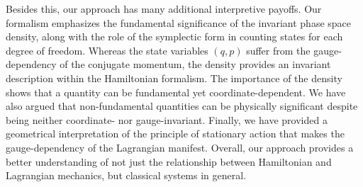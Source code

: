\documentclass[letterpaper]{article}
\begin{document}
Besides this, our approach has many additional interpretive payoffs. Our formalism emphasizes the fundamental significance of the invariant phase space density, along with the role of the symplectic form in counting states for each degree of freedom. Whereas the state variables $(q, p)$ suffer from the gauge-dependency of the conjugate momentum, the density provides an invariant description within the Hamiltonian formalism. The importance of the density shows that a quantity can be fundamental yet coordinate-dependent. We have also argued that non-fundamental quantities can be physically significant despite being neither coordinate- nor gauge-invariant. Finally, we have provided a geometrical interpretation of the principle of stationary action that makes the gauge-dependency of the Lagrangian manifest. Overall, our approach provides a better understanding of not just the relationship between Hamiltonian and Lagrangian mechanics, but classical systems in general.





\end{document}
